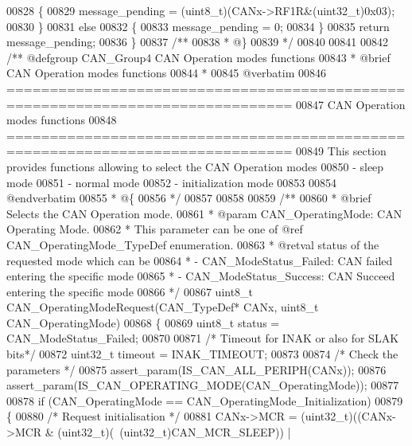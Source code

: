 \begin{DoxyCode}
00828   \{
00829     message\_pending = (uint8\_t)(CANx->RF1R&(uint32\_t)0x03);
00830   \}
00831   \textcolor{keywordflow}{else}
00832   \{
00833     message\_pending = 0;
00834   \}
00835   \textcolor{keywordflow}{return} message\_pending;
00836 \}
00837 \textcolor{comment}{/**}
00838 \textcolor{comment}{  * @\}}
00839 \textcolor{comment}{  */}
00840 
00841 
00842 \textcolor{comment}{/** @defgroup CAN\_Group4 CAN Operation modes functions}
00843 \textcolor{comment}{ *  @brief    CAN Operation modes functions }
00844 \textcolor{comment}{ *}
00845 \textcolor{comment}{@verbatim    }
00846 \textcolor{comment}{ ===============================================================================}
00847 \textcolor{comment}{                      CAN Operation modes functions}
00848 \textcolor{comment}{ ===============================================================================  }
00849 \textcolor{comment}{  This section provides functions allowing to select the CAN Operation modes}
00850 \textcolor{comment}{  - sleep mode}
00851 \textcolor{comment}{  - normal mode }
00852 \textcolor{comment}{  - initialization mode}
00853 \textcolor{comment}{   }
00854 \textcolor{comment}{@endverbatim}
00855 \textcolor{comment}{  * @\{}
00856 \textcolor{comment}{  */}
00857 
00858 
00859 \textcolor{comment}{/**}
00860 \textcolor{comment}{  * @brief  Selects the CAN Operation mode.}
00861 \textcolor{comment}{  * @param  CAN\_OperatingMode: CAN Operating Mode.}
00862 \textcolor{comment}{  *         This parameter can be one of @ref CAN\_OperatingMode\_TypeDef enumeration.}
00863 \textcolor{comment}{  * @retval status of the requested mode which can be }
00864 \textcolor{comment}{  *         - CAN\_ModeStatus\_Failed:  CAN failed entering the specific mode }
00865 \textcolor{comment}{  *         - CAN\_ModeStatus\_Success: CAN Succeed entering the specific mode }
00866 \textcolor{comment}{  */}
00867 uint8\_t CAN_OperatingModeRequest(CAN\_TypeDef* CANx, uint8\_t CAN\_OperatingMode)
00868 \{
00869   uint8\_t status = CAN_ModeStatus_Failed;
00870 
00871   \textcolor{comment}{/* Timeout for INAK or also for SLAK bits*/}
00872   uint32\_t timeout = INAK_TIMEOUT;
00873 
00874   \textcolor{comment}{/* Check the parameters */}
00875   assert_param(IS\_CAN\_ALL\_PERIPH(CANx));
00876   assert_param(IS\_CAN\_OPERATING\_MODE(CAN\_OperatingMode));
00877 
00878   \textcolor{keywordflow}{if} (CAN\_OperatingMode == CAN_OperatingMode_Initialization)
00879   \{
00880     \textcolor{comment}{/* Request initialisation */}
00881     CANx->MCR = (uint32\_t)((CANx->MCR & (uint32\_t)(~(uint32\_t)CAN_MCR_SLEEP)) | 

\end{DoxyCode}
